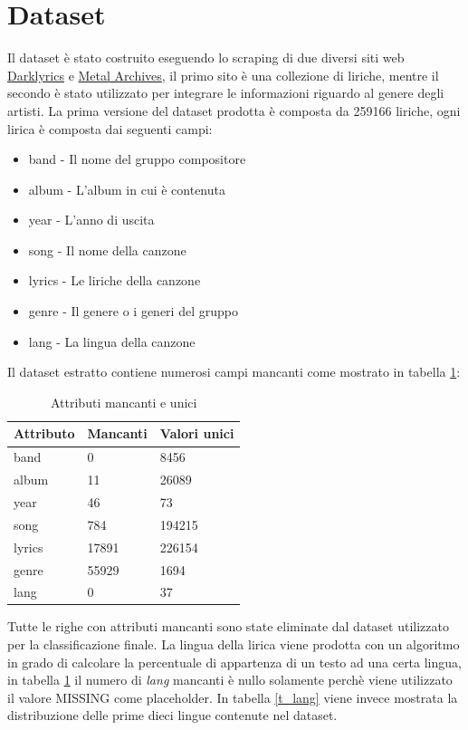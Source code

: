 \documentclass[technote]{IEEEtran}
\begin{document}
\section{Dataset}
Il dataset è stato costruito eseguendo lo scraping di due diversi siti web \href{http://www.darklyrics.com}{Darklyrics} e \href{https://www.metal-archives.com/}{Metal Archives}, il primo sito è una collezione di liriche, mentre il secondo è stato utilizzato per integrare le informazioni riguardo al genere degli artisti. 
La prima versione del dataset prodotta è composta da 259166 liriche, ogni lirica è composta dai seguenti campi:
\begin{itemize}
\item band - Il nome del gruppo compositore
\item album - L'album in cui è contenuta
\item year - L'anno di uscita
\item song - Il nome della canzone
\item lyrics - Le liriche della canzone
\item genre - Il genere o i generi del gruppo
\item lang - La lingua della canzone
\end{itemize}
Il dataset estratto contiene numerosi campi mancanti come mostrato in tabella \ref{t_missing}:
\begin{table}[H]
\centering
\caption{Attributi mancanti e unici}
\begin{tabular}{|l|l|l|}
\hline
\textbf{Attributo} & \textbf{Mancanti} & \textbf{Valori unici} \\ \hline
band               & 0                 & 8456                  \\ \hline
album              & 11                & 26089                 \\ \hline
year               & 46                & 73                    \\ \hline
song               & 784               & 194215                \\ \hline
lyrics             & 17891             & 226154                \\ \hline
genre              & 55929             & 1694                  \\ \hline
lang               & 0             	   & 37                    \\ \hline
\end{tabular}
\label{t_missing}
\end{table}
Tutte le righe con attributi mancanti sono state eliminate dal dataset utilizzato per la classificazione finale. La lingua della lirica viene prodotta con un algoritmo in grado di calcolare la percentuale di appartenza di un testo ad una certa lingua, in tabella \ref{t_missing} il numero di \textit{lang} mancanti è nullo solamente perchè viene utilizzato il valore MISSING come placeholder. In tabella \ref{t_lang} viene invece mostrata la distribuzione delle prime dieci lingue contenute nel dataset.
\end{document}
